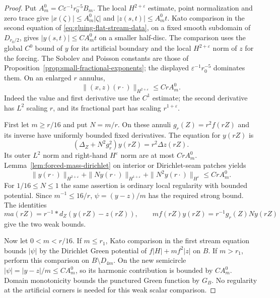 \documentclass[11pt]{amsart}
\theoremstyle{definition}
\theoremstyle{remark}
\theoremstyle{plain}
\begin{document}
\begin{proof}
Put $A_m^0=C\varepsilon^{-1}r_0^{-5}B_m$. The local
$H^{2+\varepsilon}$ estimate, point normalization and zero trace give
$|x(\zeta)|\leq A_m^0|\zeta|$ and
$|z(s,t)|\leq A_m^0t$. Kato comparison in the second equation
of \eqref{eq:gluing-flat-stream-data}, on a fixed smooth subdomain
of $D_{r_0/2}$, gives $|y(s,t)|\leq CA_m^0t$ on a smaller
half-disc. The comparison uses the global $C^0$ bound of $y$
for its artificial boundary and the local $H^{2+\varepsilon}$
norm of $z$ for the forcing. The Sobolev and Poisson constants
are those of Proposition~\ref{prop:small-fractional-exponents};
the displayed $\varepsilon^{-1}r_0^{-5}$ dominates them.
On an enlarged $r$ annulus,
\[
                 \|(x,z)(r\cdot)\|_{H^{2+\varepsilon}}
                                                 \leq CrA_m^0.
\]
Indeed the value and first derivative use the $C^1$ estimate;
the second derivative has $L^2$ scaling $r$, and its fractional
part has scaling $r^{1+\varepsilon}$.

First let $m\geq r/16$ and put $N=m/r$. On these annuli
$g_r(Z)=r^2f(rZ)$ and its inverse have uniformly bounded
fixed derivatives. The equation for $y(rZ)$ is
\[
 (\Delta_Z+N^2g_r^2)y(rZ)=r^2\Delta z(rZ).
\]
Its outer $L^2$ norm and right-hand $H^\varepsilon$ norm are
at most $CrA_m^0$. Lemma~\ref{lem:forced-mass-dirichlet} on
interior or Dirichlet-seam patches yields
\[
 \|y(r\cdot)\|_{H^{2+\varepsilon}}
 +\|Ny(r\cdot)\|_{H^{1+\varepsilon}}
 +\|N^2y(r\cdot)\|_{H^\varepsilon}\leq CrA_m^0.
\]
For $1/16\leq N\leq1$ the same assertion is ordinary local
regularity with bounded potential. Since $m^{-1}\leq16/r$,
$\psi=(y-z)/m$ has the required strong bound. The identities
\[
 ma(rZ)=r^{-1}*d_Z(y(rZ)-z(rZ)),\qquad
 mf(rZ)y(rZ)=r^{-1}g_r(Z)Ny(rZ)
\]
give the two weak bounds.

Now let $0<m<r/16$. If $m\leq r_1$, Kato comparison in the
first stream equation bounds $|\psi|$ by the Dirichlet Green
potential of $f|H|+mf^2|z|$ on $B$. If $m>r_1$, perform
this comparison on $B\setminus D_{4m}$. On the new semicircle
$|\psi|=|y-z|/m\leq CA_m^0$, so its harmonic contribution is
bounded by $CA_m^0$. Domain monotonicity bounds the punctured
Green function by $G_B$. No regularity at the artificial corners
is needed for this weak scalar comparison.


\end{proof}
\end{document}
